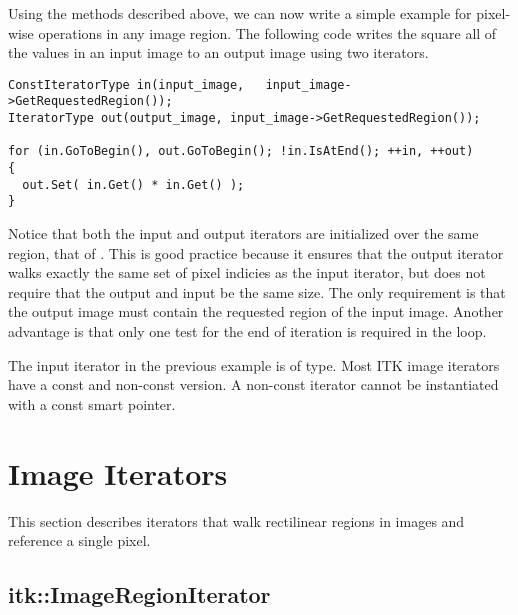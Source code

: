 Using the methods described above, we can now write a simple example for
pixel-wise operations in any image region.  The following code writes the
square all of the values in an input image to an output image using two
iterators.

\begin{verbatim}
ConstIteratorType in(input_image,   input_image->GetRequestedRegion());
IteratorType out(output_image, input_image->GetRequestedRegion());

for (in.GoToBegin(), out.GoToBegin(); !in.IsAtEnd(); ++in, ++out)
{
  out.Set( in.Get() * in.Get() );
}
\end{verbatim}

Notice that both the input and output iterators are initialized over the same
region, that of .  This is good practice because it ensures
that the output iterator walks exactly the same set of pixel indicies as the
input iterator, but does not require that the output and input be the same
size.  The only requirement is that the output image must contain the requested
region of the input image.  Another advantage is that only one test for the end
of iteration is required in the  loop.

The input iterator in the previous example is of  type.  Most ITK
image iterators have a const and non-const version.  A non-const iterator
cannot be instantiated with a const  smart pointer.




\section{Image Iterators}
\label{sec:ImageIterators}
This section describes iterators that walk rectilinear regions in images and
reference a single pixel.


\subsection{itk::ImageRegionIterator}
\label{sec:itkImageRegionIterator}


